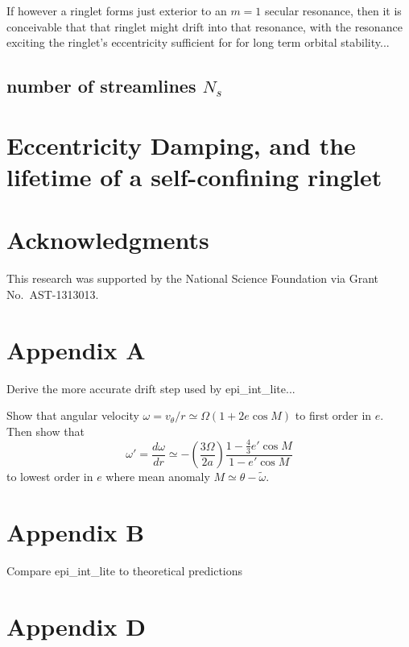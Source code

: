 \documentclass[preprint]{aastex62}
\begin{document}
If however a ringlet forms just exterior to an $m=1$ secular resonance, then it is conceivable
that that ringlet might drift into that resonance, with the resonance
exciting the ringlet's eccentricity sufficient for
for long term orbital stability...


\subsection{number of streamlines $N_s$}
\label{subsec:streamlines}


\section{Eccentricity Damping, and the lifetime of a self-confining ringlet}
\label{sec:e-damping}


\acknowledgments
\section{Acknowledgments}
\label{sec:Acknowledgments}

This research was supported by the National Science Foundation via Grant No.\ AST-1313013.


\appendix

\section{Appendix A}
\label{sec:Appendix A}

Derive the more accurate drift step used by epi\_int\_lite...

Show that angular velocity $\omega=v_\theta/r\simeq\Omega(1+2e\cos M)$ to
first order in $e$. Then show that
\begin{equation}
    \label{eqn:domega-dr}
    \omega' = \frac{d\omega}{dr} \simeq -\left(\frac{3\Omega}{2a}\right)
        \frac{1-\frac{4}{3}e'\cos M}{1-e'\cos M}
\end{equation}
to lowest order in $e$ where mean anomaly $M\simeq\theta-\tilde{\omega}$.

\section{Appendix B}
\label{sec:Appendix B}

Compare epi\_int\_lite to theoretical predictions

\section{Appendix D}
\label{sec:Appendix D}
\end{document}
